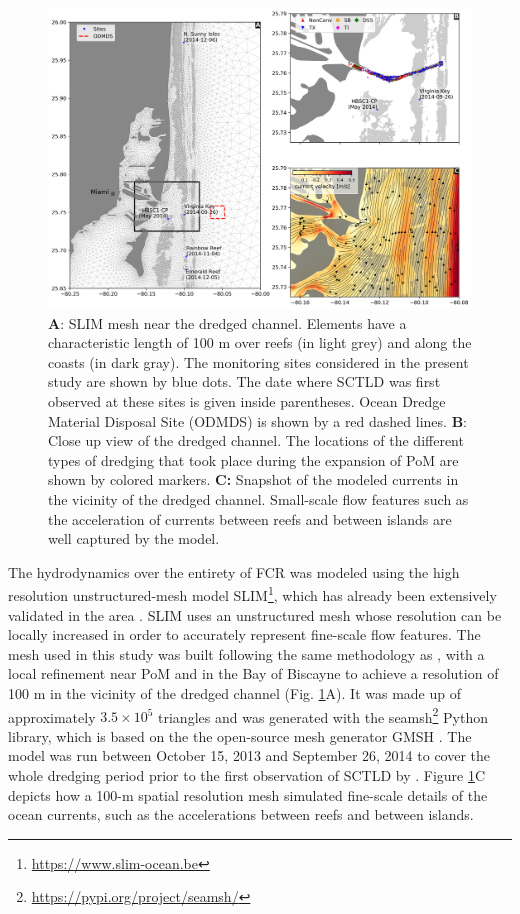 \documentclass[preprint,12pt,authoryear]{elsarticle}
\begin{document}
\begin{figure}
    \centering
    \includegraphics[width=\textwidth]{figures/fig_mesh_onset.png}
    \caption{\textbf{A}: SLIM mesh near the dredged channel. Elements have a characteristic length of 100 m over reefs (in light grey) and along the coasts (in dark gray). The monitoring sites considered in the present study are shown by blue dots. The date where SCTLD was first observed at these sites is given inside parentheses. Ocean Dredge Material Disposal Site (ODMDS) is shown by a red dashed lines. \textbf{B}: Close up view of the dredged channel. The locations of the different types of dredging that took place during the expansion of PoM are shown by colored markers. \textbf{C:} Snapshot of the modeled currents in the vicinity of the dredged channel. Small-scale flow features such as the acceleration of currents between reefs and between islands are well captured by the model.}
    \label{fig:onset_mesh}
\end{figure}

The hydrodynamics over the entirety of FCR was modeled using the high resolution unstructured-mesh model SLIM\footnote{\url{ https://www.slim-ocean.be}}, which has already been extensively validated in the area \citep{frys20,dobbelaere2020coupled,dobbelaere2022}. SLIM uses an unstructured mesh whose resolution can be locally increased in order to accurately represent fine-scale flow features. The mesh used in this study was built following the same methodology as \cite{dobbelaere2022}, with a local refinement near PoM and in the Bay of Biscayne to achieve a resolution of 100 m in the vicinity of the dredged channel (Fig. \ref{fig:onset_mesh}A). It was made up of approximately $3.5\times 10^5$ triangles and was generated with the seamsh\footnote{\url{https://pypi.org/project/seamsh/}} Python library, which is based on the the open-source mesh generator GMSH \citep{geuzaine2009gmsh}. The model was run between October 15, 2013 and September 26, 2014 to cover the whole dredging period prior to the first observation of SCTLD by \cite{precht2016unprecedented}. Figure \ref{fig:onset_mesh}C depicts how a 100-m spatial resolution mesh simulated fine-scale details of the ocean currents, such as the accelerations between reefs and between islands.
\end{document}
